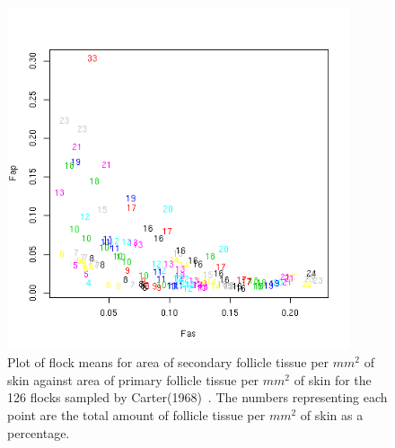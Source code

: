 %

\begin{figure}[!h]
  \centering
   \includegraphics[width=0.9\textwidth]{fasfap.png}
  \caption{Plot of flock means for area of secondary follicle tissue per $mm^{2}$ of skin against area of primary follicle tissue per $mm^{2}$ of skin for the 126 flocks sampled by Carter(1968)~\cite{cart:68}. The numbers representing each point are the total amount of follicle tissue per $mm^{2}$ of skin as a percentage.}
  \label{fig:fasfap}
\end{figure}

%

